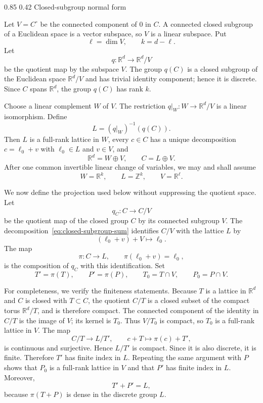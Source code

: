\documentclass[11pt,reqno]{amsart}
\makeatletter
\numberwithin{equation}{section}
\renewcommand\subsection{\@startsection{subsection}{2}{\z@}%
  {0.85\baselineskip \@plus 0.25\baselineskip \@minus 0.10\baselineskip}%
  {0.42\baselineskip}%
  {\normalfont\bfseries}}
\theoremstyle{definition}
\theoremstyle{remark}
\newcommand{\R}{\mathbb R}
\newcommand{\Z}{\mathbb Z}
\makeatother
\begin{document}
\subsection{Closed-subgroup normal form}

Let $V=C^\circ$ be the connected component of $0$ in $C$.  A connected
closed subgroup of a Euclidean space is a vector subspace, so $V$ is a
linear subspace.  Put
\[
 \ell=\dim V,
 \qquad
 k=d-\ell.
\]
Let
\[
 q:\R^d\longrightarrow \R^d/V
\]
be the quotient map by the subspace $V$.  The group $q(C)$ is a closed
subgroup of the Euclidean space $\R^d/V$ and has trivial identity component;
hence it is discrete.  Since $C$ spans $\R^d$, the group $q(C)$ has rank
$k$.

Choose a linear complement $W$ of $V$.  The restriction
$q|_W:W\to\R^d/V$ is a linear isomorphism.  Define
\[
 L=(q|_W)^{-1}(q(C)).
\]
Then $L$ is a full-rank lattice in $W$, every $c\in C$ has a unique
decomposition $c=\ell_0+v$ with $\ell_0\in L$ and $v\in V$, and
\begin{equation}\label{eq:closed-subgroup-sum}
 \R^d=W\oplus V,
 \qquad
 C=L\oplus V.
\end{equation}
After one common invertible linear change of variables, we may and shall
assume
\[
 W=\R^k,
 \qquad
 L=\Z^k,
 \qquad
 V=\R^\ell.
\]

We now define the projection used below without suppressing the quotient
space.  Let
\[
 q_C:C\longrightarrow C/V
\]
be the quotient map of the closed group $C$ by its connected subgroup $V$.
The decomposition~\eqref{eq:closed-subgroup-sum} identifies $C/V$ with the
lattice $L$ by
\[
 (\ell_0+v)+V\longmapsto\ell_0.
\]
The map
\begin{equation}\label{eq:pi-explicit}
 \pi:C\longrightarrow L,
 \qquad
 \pi(\ell_0+v)=\ell_0,
\end{equation}
is the composition of $q_C$ with this identification.  Set
\[
 T'=\pi(T),
 \qquad
 P'=\pi(P),
 \qquad
 T_0=T\cap V,
 \qquad
 P_0=P\cap V.
\]

For completeness, we verify the finiteness statements.  Because $T$ is a
lattice in $\R^d$ and $C$ is closed with $T\subset C$, the quotient $C/T$ is
a closed subset of the compact torus $\R^d/T$, and is therefore compact.
The connected component of the identity in $C/T$ is the image of $V$; its
kernel is $T_0$.  Thus $V/T_0$ is compact, so $T_0$ is a full-rank lattice
in $V$.  The map
\[
 C/T\longrightarrow L/T',
 \qquad
 c+T\longmapsto\pi(c)+T',
\]
is continuous and surjective.  Hence $L/T'$ is compact.  Since it is also
discrete, it is finite.  Therefore $T'$ has finite index in $L$.  Repeating
the same argument with $P$ shows that $P_0$ is a full-rank lattice in $V$
and that $P'$ has finite index in $L$.  Moreover,
\[
 T'+P'=L,
\]
because $\pi(T+P)$ is dense in the discrete group $L$.
\end{document}
